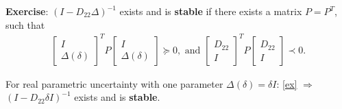 %
%
%
%
%
\textbf{Exercise}: $(I - D_{22} \Delta)^{-1}$ exists and is \textbf{stable} if there exists a matrix $P = P^T$, such that 
\begin{align}
\label{ex} 
\begin{bmatrix}
I\\
\Delta(\delta)
\end{bmatrix}^T 
P
\begin{bmatrix}
I \\ \Delta(\delta)
\end{bmatrix} \succeq 0,
\text{ and }
\begin{bmatrix}
D_{22} \\ I 
\end{bmatrix}^T
P
\begin{bmatrix}
D_{22} \\ I
\end{bmatrix} \prec 0. \tag{*}
\end{align}

For real parametric uncertainty with one parameter $\Delta(\delta) = \delta I$: \eqref{ex} $\Rightarrow$ $(I - D_{22}\delta I )^{-1}$ exists and is  \textbf{stable}. 


